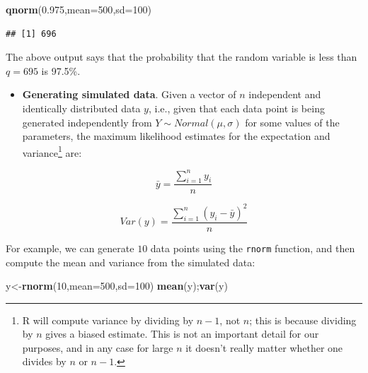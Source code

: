 \documentclass[12pt,]{krantz}
\newenvironment{Shaded}{\begin{snugshade}}{\end{snugshade}}
\newcommand{\DataTypeTok}[1]{\textcolor[rgb]{0.13,0.29,0.53}{#1}}
\newcommand{\DecValTok}[1]{\textcolor[rgb]{0.00,0.00,0.81}{#1}}
\newcommand{\FloatTok}[1]{\textcolor[rgb]{0.00,0.00,0.81}{#1}}
\newcommand{\KeywordTok}[1]{\textcolor[rgb]{0.13,0.29,0.53}{\textbf{#1}}}
\newcommand{\NormalTok}[1]{#1}
\providecommand{\tightlist}{%
  \setlength{\itemsep}{0pt}\setlength{\parskip}{0pt}}
\theoremstyle{definition}
\theoremstyle{definition}
\theoremstyle{definition}
\theoremstyle{remark}
\begin{document}
\begin{Shaded}
\begin{Highlighting}[]
\KeywordTok{qnorm}\NormalTok{(}\FloatTok{0.975}\NormalTok{,}\DataTypeTok{mean=}\DecValTok{500}\NormalTok{,}\DataTypeTok{sd=}\DecValTok{100}\NormalTok{)}
\end{Highlighting}
\end{Shaded}

\begin{verbatim}
## [1] 696
\end{verbatim}

The above output says that the probability that the random variable is less than \(q=695\) is 97.5\%.

\begin{itemize}
\tightlist
\item
  \textbf{Generating simulated data}. Given a vector of \(n\) independent and identically distributed data \(y\), i.e., given that each data point is being generated independently from \(Y \sim Normal(\mu,\sigma)\) for some values of the parameters, the maximum likelihood estimates for the expectation and variance\footnote{R will compute variance by dividing by \(n-1\), not \(n\); this is because dividing by \(n\) gives a biased estimate. This is not an important detail for our purposes, and in any case for large \(n\) it doesn't really matter whether one divides by \(n\) or \(n-1\).} are:
\end{itemize}

\begin{equation}
\bar{y} =  \frac{\sum_{i=1}^n y_i}{n} 
\end{equation}

\begin{equation}
Var(y) = \frac{\sum_{i=1}^n (y_i-
\bar{y})^2}{n}
\end{equation}

For example, we can generate \(10\) data points using the \texttt{rnorm} function, and then compute the mean and variance from the simulated data:

\begin{Shaded}
\begin{Highlighting}[]
\NormalTok{y<-}\KeywordTok{rnorm}\NormalTok{(}\DecValTok{10}\NormalTok{,}\DataTypeTok{mean=}\DecValTok{500}\NormalTok{,}\DataTypeTok{sd=}\DecValTok{100}\NormalTok{)}
\KeywordTok{mean}\NormalTok{(y);}\KeywordTok{var}\NormalTok{(y)}
\end{Highlighting}
\end{Shaded}
\end{document}
